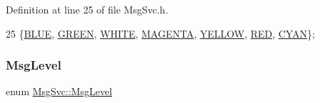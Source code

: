Definition at line 25 of file Msg\+Svc.\+h.


\begin{DoxyCode}
25 \{\hyperlink{classMsgSvc_af95de99b5b2e7b6754b6d94ec5526d2ca1dcf5030a7b8beb983fd3dc8308eb066}{BLUE}, \hyperlink{classMsgSvc_af95de99b5b2e7b6754b6d94ec5526d2ca0b06352b93e105a1b59d246e3ab1473f}{GREEN},  \hyperlink{classMsgSvc_af95de99b5b2e7b6754b6d94ec5526d2ca7eb16ade63c14f1eca4a79c0d3316b1e}{WHITE}, \hyperlink{classMsgSvc_af95de99b5b2e7b6754b6d94ec5526d2cab9a69d49c8dcce5f9df100509d2b0bf0}{MAGENTA}, \hyperlink{classMsgSvc_af95de99b5b2e7b6754b6d94ec5526d2cafc5827dd1cc81b88110254bfbdf1add2}{YELLOW}, \hyperlink{classMsgSvc_af95de99b5b2e7b6754b6d94ec5526d2ca5c5593ef0eafd0335e37f9060a0cc097}{RED}, \hyperlink{classMsgSvc_af95de99b5b2e7b6754b6d94ec5526d2ca75e9a07cb216444b43234f5092559caf}{CYAN}\};
\end{DoxyCode}
\mbox{\label{classMsgSvc_ae671eb7301996cd049d2da8a65925926}} 
\subsubsection{\texorpdfstring{Msg\+Level}{MsgLevel}}
{\footnotesize\ttfamily enum \hyperlink{classMsgSvc_ae671eb7301996cd049d2da8a65925926}{Msg\+Svc\+::\+Msg\+Level}}

